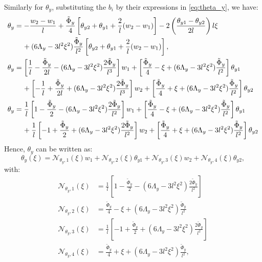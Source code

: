 \documentclass[a4paper,11pt]{article}
\begin{document}
\noindent Similarly for $\theta_y$, substituting the $b_i$ by their expressions in
\eqref{eq:theta_y}, we have:
\begin{align}
	\theta_y & = - \frac{w_2 - w_1}{l} + \frac{\tilde{\Phi}_y}{4} \left[ \theta_{y2} + \theta_{y1} + \frac{2}{l}(w_2-w_1) \right] - 2 \left( \frac{\theta_{y1} - \theta_{y2}}{2l} \right) l \xi \nonumber \\
	& \text{\hspace{4mm}} + (6\Lambda_y - 3 l^2 \xi^2) \frac{\tilde{\Phi}_y}{l^2} \left[ \theta_{y2} + \theta_{y1} + \frac{2}{l}(w_2-w_1) \right], \nonumber\\
	\theta_y & = \left[ \frac{1}{l} - \frac{\tilde{\Phi}_y}{2l} - (6\Lambda_y - 3 l^2 \xi^2) \frac{2\tilde{\Phi}_y}{l^3} \right] w_1 + \left[ \frac{\tilde{\Phi}_y}{4} - \xi + (6\Lambda_y - 3 l^2 \xi^2) \frac{\tilde{\Phi}_y}{l^2} \right] \theta_{y1} \nonumber \\
	& \text{\hspace{4mm}} + \left[ -\frac{1}{l} + \frac{\tilde{\Phi}_y}{2l} + (6\Lambda_y - 3 l^2 \xi^2) \frac{2\tilde{\Phi}_y}{l^3} \right] w_2 + \left[ \frac{\tilde{\Phi}_y}{4} + \xi + (6\Lambda_y - 3 l^2 \xi^2) \frac{\tilde{\Phi}_y}{l^2} \right] \theta_{y2} \nonumber \\
	\theta_y & = \frac{1}{l} \left[ 1 - \frac{\tilde{\Phi}_y}{2} - (6\Lambda_y - 3 l^2 \xi^2) \frac{2\tilde{\Phi}_y}{l^2} \right] w_1 + \left[ \frac{\tilde{\Phi}_y}{4} - \xi + (6\Lambda_y - 3 l^2 \xi^2) \frac{\tilde{\Phi}_y}{l^2} \right] \theta_{y1} \nonumber \\
	& \text{\hspace{4mm}} + \frac{1}{l} \left[ -1 + \frac{\tilde{\Phi}_y}{2} + (6\Lambda_y - 3 l^2 \xi^2) \frac{2\tilde{\Phi}_y}{l^2} \right] w_2 + \left[ \frac{\tilde{\Phi}_y}{4} + \xi + (6\Lambda_y - 3 l^2 \xi^2) \frac{\tilde{\Phi}_y}{l^2} \right] \theta_{y2}
\end{align}
Hence, $\theta_y$ can be written as:
\begin{equation} \label{eq:theta_y_expr_final}
	\theta_y(\xi) = \mathcal{N}_{\theta_y,1}(\xi)w_1 + \mathcal{N}_{\theta_y,2}(\xi)\theta_{y1} + \mathcal{N}_{\theta_y,3}(\xi)w_2 + \mathcal{N}_{\theta_y,4}(\xi)\theta_{y2},
\end{equation}
with:
\begin{equation}
\begin{aligned}
	\mathcal{N}_{\theta_y,1}(\xi) & = \frac{1}{l} \left[ 1 - \frac{\tilde{\Phi}_y}{2} - (6\Lambda_y - 3 l^2 \xi^2) \frac{2\tilde{\Phi}_y}{l^2} \right] \\
	\mathcal{N}_{\theta_y,2}(\xi) & = \frac{\tilde{\Phi}_y}{4} - \xi + (6\Lambda_y - 3 l^2 \xi^2) \frac{\tilde{\Phi}_y}{l^2} \\
	\mathcal{N}_{\theta_y,3}(\xi) & = \frac{1}{l} \left[ -1 + \frac{\tilde{\Phi}_y}{2} + (6\Lambda_y - 3 l^2 \xi^2) \frac{2\tilde{\Phi}_y}{l^2} \right] \\
	\mathcal{N}_{\theta_y,4}(\xi) & =\frac{\tilde{\Phi}_y}{4} + \xi + (6\Lambda_y - 3 l^2 \xi^2) \frac{\tilde{\Phi}_y}{l^2},
\end{aligned}
\end{equation}
\end{document}
